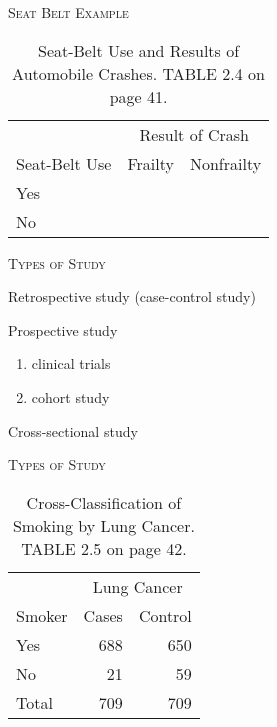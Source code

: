 \documentclass[dvipdfmx, serif,handout]{beamer}
\begin{document}
\begin{frame}{\textsc{Seat Belt Example}}

{\footnotesize
\begin{table}
\begin{tabular}{lcc} \hline
& \multicolumn{2}{c}{Result of Crash} \\ \cline{2-3}
Seat-Belt Use & Frailty & Nonfrailty \\ \hline
Yes \\
No \\ \hline
\end{tabular}
\caption{\footnotesize Seat-Belt Use and Results of Automobile Crashes. TABLE 2.4 on page 41.}
\end{table}
}

\end{frame}
\begin{frame}{\textsc{Types of Study}}

\bi
\item Retrospective study (case-control study)
\item Prospective study
\begin{enumerate}
\item clinical trials
\item cohort study
\end{enumerate}
\item Cross-sectional study
\ei

\end{frame}
\begin{frame}{\textsc{Types of Study}}

{\footnotesize
\begin{table}
\begin{tabular}{lrr} \hline
& \multicolumn{2}{c}{Lung Cancer} \\ \cline{2-3}
Smoker & Cases & Control \\ \hline
Yes & 688 & 650 \\
No  & 21 & 59 \\ \hline
\hspace{.2cm} Total & 709 & 709 \\ \hline
\end{tabular}
\caption{\footnotesize Cross-Classification of Smoking by Lung Cancer. TABLE 2.5 on page 42.}
\end{table}
}

\end{frame}
\end{document}
